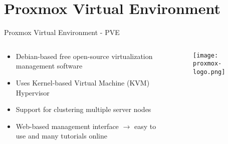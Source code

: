 \section{Proxmox Virtual Environment}

\begin{frame}{Proxmox Virtual Environment - PVE}
    \begin{columns}
        \begin{column}{0.6\linewidth}
            \begin{itemize}
                \item Debian-based free open-source virtualization management software
                \item Uses Kernel-based Virtual Machine (KVM) Hypervisor
                \item Support for clustering multiple server nodes
                \item Web-based management interface $\rightarrow$ easy to use and many tutorials online
            \end{itemize}
        \end{column}
        \begin{column}{0.4\linewidth}
            \begin{figure}
                \centering
                \texttt{[image: proxmox-logo.png]}\\
                \cite{proxmox-logo}
            \end{figure}
        \end{column}
    \end{columns}
\end{frame}

\printbibliography[title = {Sources}, heading=none]
